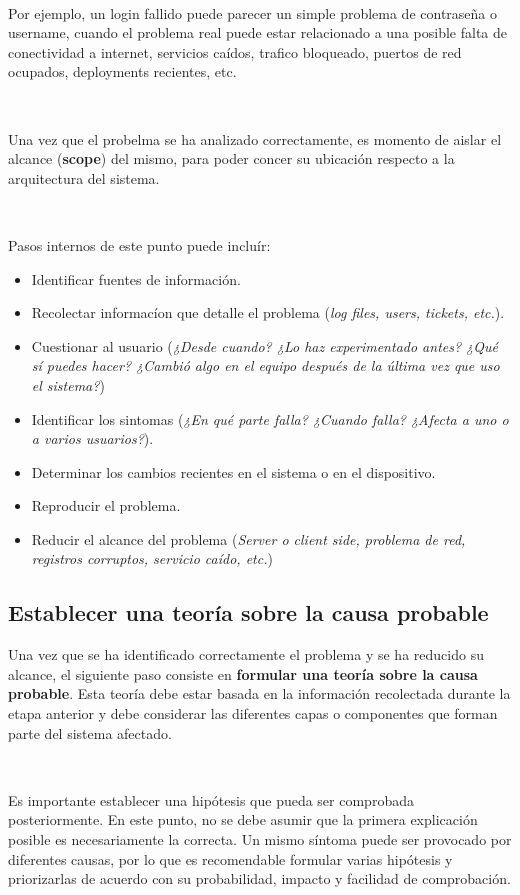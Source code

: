 \documentclass[a4paper,10pt]{article}
\begin{document}
\

Por ejemplo, un login fallido puede parecer un simple problema de contraseña o username, cuando el problema real puede estar relacionado a una posible falta
de conectividad a internet, servicios caídos, trafico bloqueado, puertos de red ocupados, deployments recientes, etc.

\

Una vez que el probelma se ha analizado correctamente, es momento de aislar el alcance (\textbf{scope}) del mismo, para poder concer su ubicación respecto a la arquitectura del sistema.

\

Pasos internos de este punto puede incluír:

\begin{itemize}
    \item Identificar fuentes de información.
    \item Recolectar informacíon que detalle el problema (\textit{log files, users, tickets, etc.}).
    \item Cuestionar al usuario (\textit{¿Desde cuando? ¿Lo haz experimentado antes? ¿Qué sí puedes hacer? ¿Cambió algo en el equipo después de la última vez que uso el sistema?})
    \item Identificar los sintomas (\textit{¿En qué parte falla? ¿Cuando falla? ¿Afecta a uno o a varios usuarios?}).
    \item Determinar los cambios recientes en el sistema o en el dispositivo.
    \item Reproducir el problema.
    \item Reducir el alcance del problema (\textit{Server o client side, problema de red, registros corruptos, servicio caído, etc.})
\end{itemize}


\subsection{Establecer una teoría sobre la causa probable}
Una vez que se ha identificado correctamente el problema y se ha reducido su alcance, el siguiente paso consiste en \textbf{formular una teoría sobre la causa probable}. 
Esta teoría debe estar basada en la información recolectada durante la etapa anterior y debe considerar las diferentes capas o componentes que forman parte del sistema afectado.

\

Es importante establecer una hipótesis que pueda ser comprobada posteriormente. 
En este punto, no se debe asumir que la primera explicación posible es necesariamente la correcta. Un mismo síntoma puede ser provocado por diferentes causas, por lo que es recomendable formular varias hipótesis y priorizarlas de acuerdo con su probabilidad, impacto y facilidad de comprobación.
\end{document}
